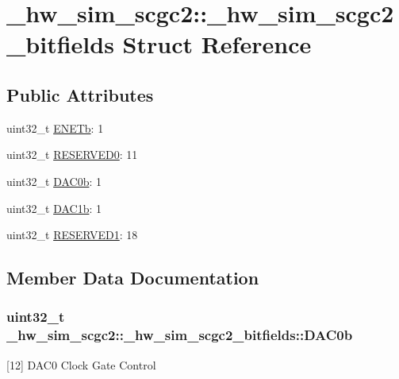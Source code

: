 \hypertarget{struct__hw__sim__scgc2_1_1__hw__sim__scgc2__bitfields}{}\section{\+\_\+hw\+\_\+sim\+\_\+scgc2\+:\+:\+\_\+hw\+\_\+sim\+\_\+scgc2\+\_\+bitfields Struct Reference}
\label{struct__hw__sim__scgc2_1_1__hw__sim__scgc2__bitfields}
\subsection*{Public Attributes}
\begin{DoxyCompactItemize}
\item 
uint32\+\_\+t \hyperlink{struct__hw__sim__scgc2_1_1__hw__sim__scgc2__bitfields_afc0a65ceb1e15bd535eee091c8522f10}{E\+N\+E\+Tb}\+: 1
\item 
uint32\+\_\+t \hyperlink{struct__hw__sim__scgc2_1_1__hw__sim__scgc2__bitfields_a97a377862527d955d03830c3655723da}{R\+E\+S\+E\+R\+V\+E\+D0}\+: 11
\item 
uint32\+\_\+t \hyperlink{struct__hw__sim__scgc2_1_1__hw__sim__scgc2__bitfields_a41cae2b8a158e5f1730a0b016b7943e1}{D\+A\+C0b}\+: 1
\item 
uint32\+\_\+t \hyperlink{struct__hw__sim__scgc2_1_1__hw__sim__scgc2__bitfields_aec18092ef80cb3ea29e227fb5bb4dda3}{D\+A\+C1b}\+: 1
\item 
uint32\+\_\+t \hyperlink{struct__hw__sim__scgc2_1_1__hw__sim__scgc2__bitfields_af5ec9783dab68b6ddf9cdba04bb64245}{R\+E\+S\+E\+R\+V\+E\+D1}\+: 18
\end{DoxyCompactItemize}


\subsection{Member Data Documentation}
\subsubsection[{\texorpdfstring{D\+A\+C0b}{DAC0b}}]{\setlength{\rightskip}{0pt plus 5cm}uint32\+\_\+t \+\_\+hw\+\_\+sim\+\_\+scgc2\+::\+\_\+hw\+\_\+sim\+\_\+scgc2\+\_\+bitfields\+::\+D\+A\+C0b}\hypertarget{struct__hw__sim__scgc2_1_1__hw__sim__scgc2__bitfields_a41cae2b8a158e5f1730a0b016b7943e1}{}\label{struct__hw__sim__scgc2_1_1__hw__sim__scgc2__bitfields_a41cae2b8a158e5f1730a0b016b7943e1}
\mbox{[}12\mbox{]} D\+A\+C0 Clock Gate Control 
